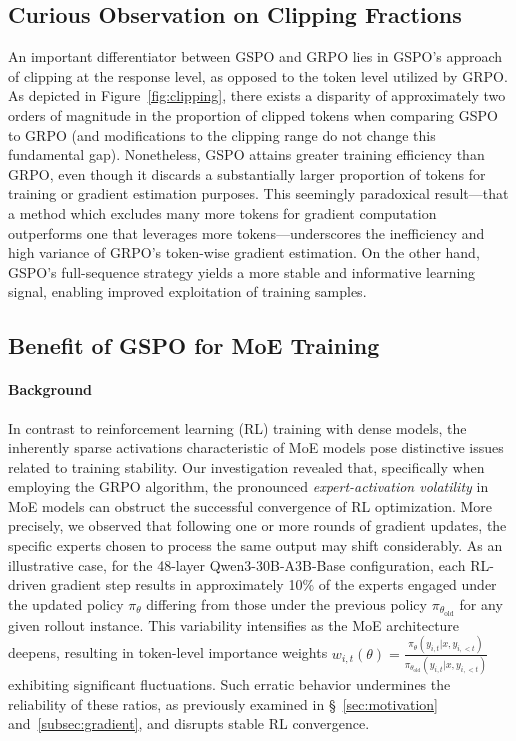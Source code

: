 \subsection{Curious Observation on Clipping Fractions}

An important differentiator between GSPO and GRPO lies in GSPO's approach of clipping at the response level, as opposed to the token level utilized by GRPO. As depicted in Figure~\ref{fig:clipping}, there exists a disparity of approximately two orders of magnitude in the proportion of clipped tokens when comparing GSPO to GRPO (and modifications to the clipping range do not change this fundamental gap). Nonetheless, GSPO attains greater training efficiency than GRPO, even though it discards a substantially larger proportion of tokens for training or gradient estimation purposes. This seemingly paradoxical result—that a method which excludes many more tokens for gradient computation outperforms one that leverages more tokens—underscores the inefficiency and high variance of GRPO's token-wise gradient estimation. On the other hand, GSPO's full-sequence strategy yields a more stable and informative learning signal, enabling improved exploitation of training samples.

\subsection{Benefit of GSPO for MoE Training}
\label{subsec:routing_replay}

\paragraph{Background}
In contrast to reinforcement learning (RL) training with dense models, the inherently sparse activations characteristic of MoE models pose distinctive issues related to training stability. Our investigation revealed that, specifically when employing the GRPO algorithm, the pronounced \textit{expert-activation volatility} in MoE models can obstruct the successful convergence of RL optimization. More precisely, we observed that following one or more rounds of gradient updates, the specific experts chosen to process the same output may shift considerably. As an illustrative case, for the 48-layer Qwen3-30B-A3B-Base configuration, each RL-driven gradient step results in approximately 10\% of the experts engaged under the updated policy $\pi_{\theta}$ differing from those under the previous policy $\pi_{\theta_\text{old}}$ for any given rollout instance. This variability intensifies as the MoE architecture deepens, resulting in token-level importance weights $w_{i,t}(\theta) = \frac{ \pi_{\theta} (y_{i,t} | x, y_{i,<t}) }{ \pi_{\theta_\text{old}} (y_{i,t} | x,y_{i,<t})}$ exhibiting significant fluctuations. Such erratic behavior undermines the reliability of these ratios, as previously examined in \S~\ref{sec:motivation} and~\ref{subsec:gradient}, and disrupts stable RL convergence.

